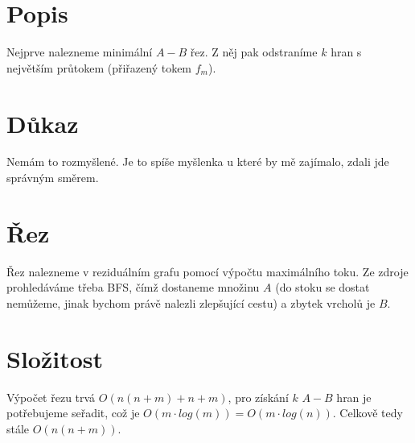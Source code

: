 \documentclass[a4paper]{article}
\begin{document}
\renewcommand{\headrulewidth}{0pt} %
\thispagestyle{fancy} %
{}

\section*{Popis}
Nejprve nalezneme minimální $A-B$ řez. Z něj pak odstraníme $k$ hran s největším průtokem (přiřazený tokem $f_m$).

\section*{Důkaz}
Nemám to rozmyšlené. Je to spíše myšlenka u které by mě zajímalo, zdali jde správným směrem.


\section*{Řez}
Řez nalezneme v reziduálním grafu pomocí výpočtu maximálního toku. Ze zdroje prohledáváme třeba BFS, čímž dostaneme množinu $A$ (do stoku se dostat nemůžeme, jinak bychom právě nalezli zlepšující cestu) a zbytek vrcholů je $B$.

\section*{Složitost}
Výpočet řezu trvá $O(n(n+m) + n+m)$, pro získání $k$ $A-B$ hran je potřebujeme seřadit, což je $O(m\cdot log(m)) = O(m\cdot log(n))$. Celkově tedy stále $O(n(n+m))$.
\end{document}
